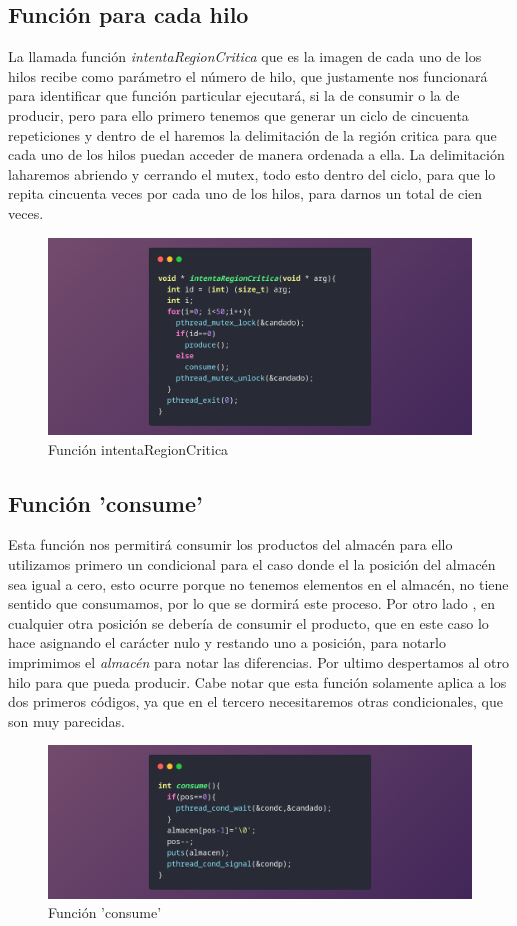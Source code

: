 \documentclass[10pt]{article}
\begin{document}
	\subsection{Función para cada hilo}
	La llamada función \emph{intentaRegionCritica} que es la imagen de cada uno de los hilos recibe como parámetro el número de hilo, que justamente nos funcionará para identificar que función particular ejecutará, si la de consumir o la de producir, pero para ello primero tenemos que generar un ciclo de cincuenta repeticiones y dentro de el haremos la delimitación de la región critica para que cada uno de los hilos puedan acceder de manera ordenada  a ella. La delimitación laharemos abriendo y cerrando el mutex, todo esto dentro del ciclo, para que lo repita cincuenta veces por cada uno de los hilos, para darnos un total de cien veces. 
	\begin{figure}[h!]
		\centering
		\includegraphics[width=\linewidth]{intentaRC.png}
		\caption{Función intentaRegionCritica}
		\label{fig:intentaRC}
	\end{figure}
	\newpage
	\subsection{Función 'consume'}
	Esta función nos permitirá consumir los productos del almacén para ello utilizamos primero un condicional para el caso donde el la posición del almacén sea igual a cero, esto ocurre porque no tenemos elementos en el almacén, no tiene sentido que consumamos, por lo que se dormirá este proceso. 
	Por otro lado , en cualquier otra posición se debería de consumir  el producto, que en este caso lo hace asignando el carácter nulo y restando uno a posición, para notarlo imprimimos el \emph{almacén} para notar las diferencias. Por ultimo despertamos al otro hilo para que pueda producir. Cabe notar que esta función solamente aplica a los dos primeros códigos, ya que en el tercero necesitaremos otras condicionales, que son muy parecidas. 
	\begin{figure}[h!]
		\centering
		\includegraphics[width=\linewidth]{consume.png}
		\caption{Función 'consume'}
		\label{fig:consume}
	\end{figure}
\end{document}
